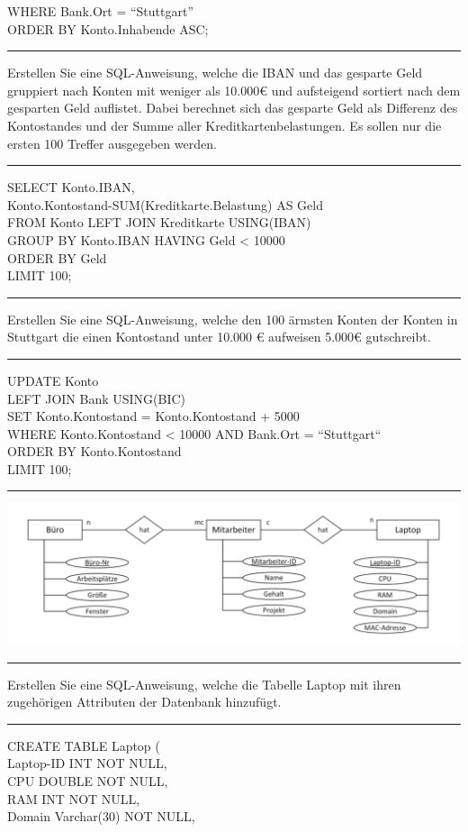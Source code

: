 \documentclass[5pt]{article}
\begin{document}
\begin{multicols*}{2}
        WHERE Bank.Ort = “Stuttgart”\\
        ORDER BY Konto.Inhabende ASC;
        \rule{\columnwidth}{0.5pt}
        Erstellen Sie eine SQL-Anweisung, welche die IBAN und das gesparte Geld gruppiert
nach Konten mit weniger als 10.000€ und aufsteigend sortiert nach dem gesparten
Geld auflistet. Dabei berechnet sich das gesparte Geld als Differenz des Kontostandes
und der Summe aller Kreditkartenbelastungen. Es sollen nur die ersten 100 Treffer
ausgegeben werden.
\rule{\columnwidth}{0.5pt}
SELECT Konto.IBAN,\\
Konto.Kontostand-SUM(Kreditkarte.Belastung) AS Geld\\
FROM Konto LEFT JOIN Kreditkarte USING(IBAN)\\
GROUP BY Konto.IBAN HAVING Geld < 10000\\
ORDER BY Geld\\
LIMIT 100;
\rule{\columnwidth}{0.5pt}
Erstellen Sie eine SQL-Anweisung, welche den 100 ärmsten Konten der Konten in
Stuttgart die einen Kontostand unter 10.000 € aufweisen 5.000€ gutschreibt.
\rule{\columnwidth}{0.5pt}
UPDATE Konto\\
LEFT JOIN Bank USING(BIC)\\
SET Konto.Kontostand = Konto.Kontostand + 5000\\
WHERE Konto.Kontostand < 10000 AND Bank.Ort = “Stuttgart“\\
ORDER BY Konto.Kontostand\\
LIMIT 100;\\
\rule{\columnwidth}{0.5pt}
\includegraphics[width= \columnwidth]{images/ws20erd.png}\\
\rule{\columnwidth}{0.5pt}
Erstellen Sie eine SQL-Anweisung, welche die Tabelle Laptop mit ihren zugehörigen
Attributen der Datenbank hinzufügt.
\rule{\columnwidth}{0.5pt}
CREATE TABLE Laptop (\\
Laptop-ID INT NOT NULL,\\
CPU DOUBLE NOT NULL,\\
RAM INT NOT NULL,\\
Domain Varchar(30) NOT NULL,\\

\end{multicols*}
\end{document}

